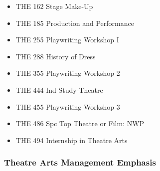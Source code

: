 \documentclass[
  letterpaper,
]{scrbook}
\providecommand{\tightlist}{%
  \setlength{\itemsep}{0pt}\setlength{\parskip}{0pt}}
\begin{document}
\begin{enumerate}
  \begin{itemize}
  \tightlist
  \item
    THE 162 Stage Make-Up\\
  \item
    THE 185 Production and Performance\\
  \item
    THE 255 Playwriting Workshop I\\
  \item
    THE 288 History of Dress\\
  \item
    THE 355 Playwriting Workshop 2\\
  \item
    THE 444 Ind Study-Theatre\\
  \item
    THE 455 Playwriting Workshop 3\\
  \item
    THE 486 Spc Top Theatre or Film: NWP\\
  \item
    THE 494 Internship in Theatre Arts
  \end{itemize}
\end{enumerate}

\subsubsection{Theatre Arts Management
Emphasis}\label{theatre-arts-management-emphasis}
\end{document}
